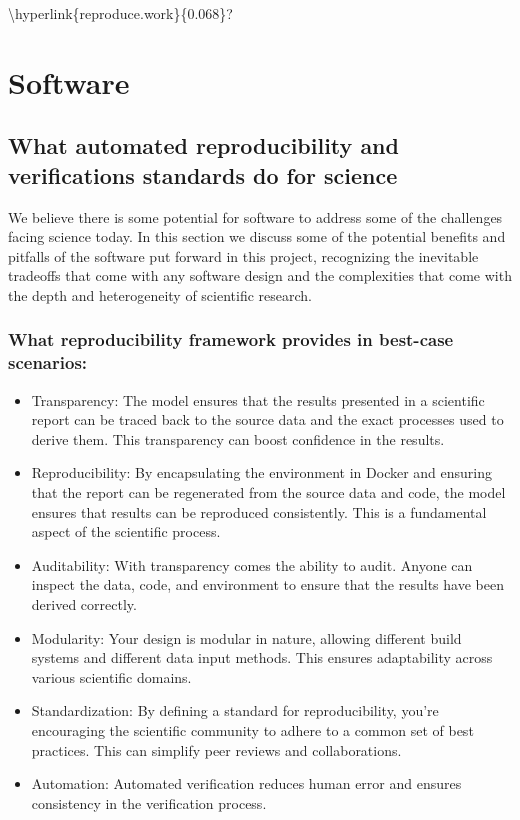 \textbackslash{}hyperlink\{reproduce.work\}\{0.068\}?

\hypertarget{software}{%
\section{Software}\label{software}}

\hypertarget{what-automated-reproducibility-and-verifications-standards-do-for-science}{%
\subsection{What automated reproducibility and verifications standards do for science}\label{what-automated-reproducibility-and-verifications-standards-do-for-science}}

We believe there is some potential for software to address some of the challenges facing science today. In this section we discuss some of the potential benefits and pitfalls of the software put forward in this project, recognizing the inevitable tradeoffs that come with any software design and the complexities that come with the depth and heterogeneity of scientific research.

\hypertarget{what-reproducibility-framework-provides-in-best-case-scenarios}{%
\subsubsection{What reproducibility framework provides in best-case scenarios:}\label{what-reproducibility-framework-provides-in-best-case-scenarios}}

\begin{itemize}
\itemsep -0.2em
\item Transparency: The model ensures that the results presented in a scientific report can be traced back to the source data and the exact processes used to derive them. This transparency can boost confidence in the results.
\item Reproducibility: By encapsulating the environment in Docker and ensuring that the report can be regenerated from the source data and code, the model ensures that results can be reproduced consistently. This is a fundamental aspect of the scientific process.
\item Auditability: With transparency comes the ability to audit. Anyone can inspect the data, code, and environment to ensure that the results have been derived correctly.
\item Modularity: Your design is modular in nature, allowing different build systems and different data input methods. This ensures adaptability across various scientific domains.
\item Standardization: By defining a standard for reproducibility, you're encouraging the scientific community to adhere to a common set of best practices. This can simplify peer reviews and collaborations.
\item Automation: Automated verification reduces human error and ensures consistency in the verification process.
\end{itemize}

